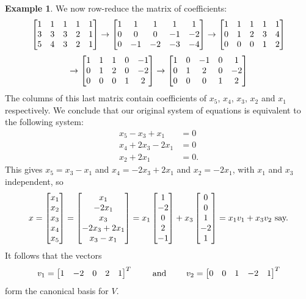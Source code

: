 \documentclass[reqno]{amsart}
\theoremstyle{definition}
\newtheorem{example}[theorem]{Example}
\begin{document}
\begin{example}
 We now row-reduce the matrix of coefficients:
 \[
    \left[\begin{matrix}
      1 & 1 & 1 & 1 & 1 \\
      3 & 3 & 3 & 2 & 1 \\
      5 & 4 & 3 & 2 & 1
    \end{matrix}\right]
    \to
    \left[\begin{matrix}
      1 & 1 & 1 & 1 & 1 \\
      0 & 0 & 0 &-1 &-2 \\
      0 &-1 &-2 &-3 & -4
    \end{matrix}\right]
    \to
    \left[\begin{matrix}
      1 & 1 & 1 & 1 & 1 \\
      0 & 1 & 2 & 3 & 4 \\
      0 & 0 & 0 & 1 & 2
    \end{matrix}\right]
 \]
 \[
    \to
    \left[\begin{matrix}
      1 & 1 & 1 & 0 &-1 \\
      0 & 1 & 2 & 0 &-2 \\
      0 & 0 & 0 & 1 & 2
    \end{matrix}\right]
    \to
    \left[\begin{matrix}
      1 & 0 &-1 & 0 & 1 \\
      0 & 1 & 2 & 0 &-2 \\
      0 & 0 & 0 & 1 & 2
    \end{matrix}\right]
 \]
 The columns of this last matrix contain coefficients of $x_5$, $x_4$,
 $x_3$, $x_2$ and $x_1$ respectively.  We conclude that our original
 system of equations is equivalent to the following system:
 \begin{align*}
  x_5 - x_3 + x_1 &= 0 \\
  x_4 + 2x_3 -2x_1 &= 0 \\
  x_2 + 2x_1 &= 0.
 \end{align*}
 This gives $x_5=x_3-x_1$ and $x_4=-2x_3+2x_1$ and $x_2=-2x_1$, with
 $x_1$ and $x_3$ independent, so
 \[ x
    = \left[\begin{matrix} x_1 \\ x_2 \\ x_3 \\ x_4 \\ x_5 \end{matrix}\right]
    = \left[\begin{matrix} x_1 \\ -2x_1 \\ x_3 \\ -2x_3+2x_1 \\ x_3-x_1 \end{matrix}\right]
    = x_1 \left[\begin{matrix} 1 \\ -2 \\ 0 \\ 2 \\ -1 \end{matrix}\right] +
      x_3 \left[\begin{matrix} 0 \\ 0 \\ 1 \\ -2 \\ 1 \end{matrix}\right]
    = x_1v_1 + x_3v_2 \text{ say.}
 \]
 It follows that the vectors
 \[ v_1 = \left[\begin{matrix} 1 & -2 & 0 & 2 & 1 \end{matrix}\right]^T
    \hspace{2em} \text{ and } \hspace{2em}
    v_2 = \left[\begin{matrix} 0 & 0 & 1 & -2 & 1 \end{matrix}\right]^T
 \]
 form the canonical basis for $V$.
\end{example}
\end{document}
